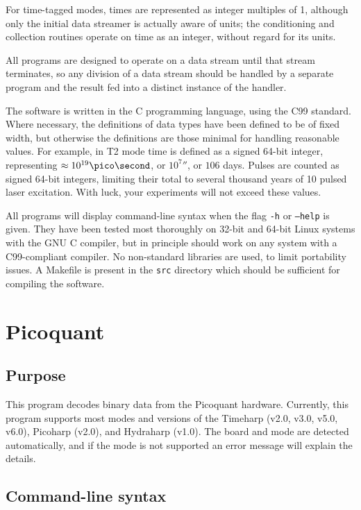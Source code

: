 \documentclass{article}
\begin{document}
For time-tagged modes, times are represented as integer multiples of 1\pico\second, although only the initial data streamer is actually aware of units; the conditioning and collection routines operate on time as an integer, without regard for its units.

All programs are designed to operate on a data stream until that stream terminates, so any division of a data stream should be handled by a separate program and the result fed into a distinct instance of the handler. 

The software is written in the C programming language, using the C99 standard. Where necessary, the definitions of data types have been defined to be of fixed width, but otherwise the definitions are those minimal for handling reasonable values. For example, in T2 mode time is defined as a signed 64-bit integer, representing $\approx 10^{19}\pico\second$, or $10^{7}\second$, or $106$ days. Pulses are counted as signed 64-bit integers, limiting their total to several thousand years of 10\mega\hertz{} pulsed laser excitation. With luck, your experiments will not exceed these values. 

All programs will display command-line syntax when the flag \texttt{-h} or \texttt{--help} is given. They have been tested most thoroughly on 32-bit and 64-bit Linux systems with the GNU C compiler, but in principle should work on any system with a C99-compliant compiler. No non-standard libraries are used, to limit portability issues. A Makefile is present in the \texttt{src} directory which should be sufficient for compiling the software.

\section{Picoquant}
\subsection{Purpose}
This program decodes binary data from the Picoquant hardware. Currently, this program supports most modes and versions of the Timeharp (v2.0, v3.0, v5.0, v6.0), Picoharp (v2.0), and Hydraharp (v1.0). The board and mode are detected automatically, and if the mode is not supported an error message will explain the details.

\subsection{Command-line syntax}
\end{document}
